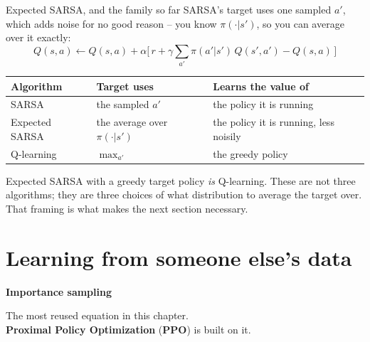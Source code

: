 \documentclass[aspectratio=169]{beamer}
\begin{document}
\begin{frame}{Expected SARSA, and the family so far}
  \small
  SARSA's target uses one sampled $a'$, which adds noise for no good reason -- you know
  $\pi(\cdot|s')$, so you can average over it exactly:
  \[ Q(s,a) \leftarrow Q(s,a) + \alpha\Big[\, r + \gamma \sum_{a'} \pi(a'|s')\,Q(s',a') - Q(s,a) \,\Big] \]

  \vskip 6pt
  \begin{center}
  \footnotesize
  \begin{tabular}{l l l}
    \toprule
    \textbf{Algorithm} & \textbf{Target uses} & \textbf{Learns the value of} \\
    \midrule
    SARSA & the sampled $a'$ & the policy it is running \\
    Expected SARSA & the average over $\pi(\cdot|s')$ & the policy it is running, less noisily \\
    Q-learning & $\max_{a'}$ & the greedy policy \\
    \bottomrule
  \end{tabular}
  \end{center}

  \vskip 8pt
  \begin{tcolorbox}[colback=armblue!8, colframe=armblue, boxrule=0.6pt, arc=2pt]
    \small
    Expected SARSA with a greedy target policy \emph{is} Q-learning. These are not three
    algorithms; they are three choices of what distribution to average the target over. That
    framing is what makes the next section necessary.
  \end{tcolorbox}
\end{frame}

\section{Learning from someone else's data}
\begin{frame}[plain]
  \begin{center}
    \vskip 1.6cm
    {\Huge\bfseries\color{popblue}Importance sampling}

    \vskip 0.6cm
    {\large The most reused equation in this chapter.\\
     \textbf{Proximal Policy Optimization} (\textbf{PPO}) is built on it.}
  \end{center}
\end{frame}
\end{document}
